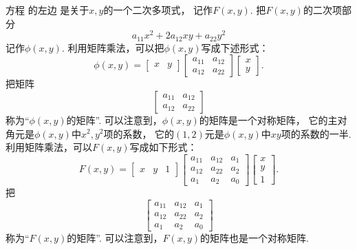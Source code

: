 方程  的左边
是关于\(x,y\)的一个二次多项式，
记作\(F(x,y)\).
把\(F(x,y)\)的二次项部分\begin{equation}
	a_{11} x^2 + 2 a_{12} x y + a_{22} y^2
\end{equation}
记作\(\phi(x,y)\).
利用矩阵乘法，可以把\(\phi(x,y)\)写成下述形式：\begin{equation}
	\phi(x,y)
	= \begin{bmatrix}
		x & y
	\end{bmatrix}
	\begin{bmatrix}
		a_{11} & a_{12} \\
		a_{12} & a_{22}
	\end{bmatrix}
	\begin{bmatrix}
		x \\ y
	\end{bmatrix}.
\end{equation}
把矩阵\begin{equation}
	\begin{bmatrix}
		a_{11} & a_{12} \\
		a_{12} & a_{22}
	\end{bmatrix}
\end{equation}
称为“\(\phi(x,y)\)的矩阵”.
可以注意到，\(\phi(x,y)\)的矩阵是一个对称矩阵，
它的主对角元是\(\phi(x,y)\)中\(x^2,y^2\)项的系数，
它的\((1,2)\)元是\(\phi(x,y)\)中\(xy\)项的系数的一半.
利用矩阵乘法，可以\(F(x,y)\)写成如下形式：\begin{equation}
	F(x,y)
	= \begin{bmatrix}
		x & y & 1
	\end{bmatrix}
	\begin{bmatrix}
		a_{11} & a_{12} & a_1 \\
		a_{12} & a_{22} & a_2 \\
		a_1 & a_2 & a_0
	\end{bmatrix}
	\begin{bmatrix}
		x \\ y \\ 1
	\end{bmatrix}.
\end{equation}
把\begin{equation}
	\begin{bmatrix}
		a_{11} & a_{12} & a_1 \\
		a_{12} & a_{22} & a_2 \\
		a_1 & a_2 & a_0
	\end{bmatrix}
\end{equation}
称为“\(F(x,y)\)的矩阵”.
可以注意到，\(F(x,y)\)的矩阵也是一个对称矩阵.
\endgroup

